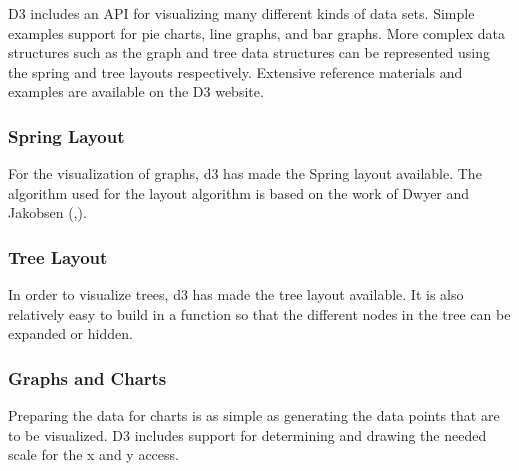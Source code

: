 D3 includes an API for visualizing many different kinds of data sets. Simple examples support for pie charts, line graphs, and bar graphs. More complex data structures such as the graph and tree data structures can be represented using the spring and tree layouts respectively. Extensive reference materials and examples are available on the D3 website.

\subsubsection{Spring Layout}

For the visualization of graphs, d3 has made the Spring layout available. The algorithm used for the layout algorithm is based on the work of Dwyer and Jakobsen (\cite{Jakobsen03},\cite{Dwyer2009}).

\subsubsection{Tree Layout}

In order to visualize trees, d3 has made the tree layout available. It is also relatively easy to build in a function so that the different nodes in the tree can be expanded or hidden.

\subsubsection{Graphs and Charts}

Preparing the data for charts is as simple as generating the data points that are to be visualized. D3 includes support for determining and drawing the needed scale for the x and y access.  